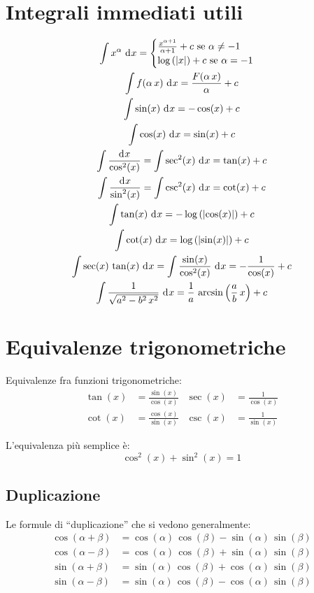 \section{Integrali immediati utili}

\begin{gather*}
\int x^{\alpha} \dx = 
\begin{cases}
\frac{x^{\alpha + 1}}{\alpha + 1} + c \text{ se } \alpha \neq -1 \\
\abslog{x} + c \text{ se } \alpha = -1
\end{cases} \\
\int f(\alpha \, x) \dx = \frac{F(\alpha \, x)}{\alpha} + c \\
\int \sin (x) \dx = - \cos (x) + c \\
\int \cos (x) \dx = \sin (x) + c \\
\int \frac{\diff x}{\cos^2 (x)} = \int \sec^2 (x) \dx = \tan (x) + c \\
\int \frac{\diff x}{\sin^2 (x)} = \int \csc^2 (x) \dx = \cot (x) + c \\
\int \tan (x) \dx = - \abslog{\cos (x)} + c \\
\int \cot (x) \dx = \abslog{\sin (x)} + c \\
\int \sec (x) \, \tan (x) \dx = \int \frac{\sin(x)}{\cos^2 (x)} \dx =
- \frac{1}{\cos(x)} + c \\
\int \frac{1}{\sqrt{a^2 - b^2 \, x^2}} \dx =
\frac{1}{a} \, \arcsin \left( \frac{a}{b} \, x \right) + c
\end{gather*}

\section{Equivalenze trigonometriche}

Equivalenze fra funzioni trigonometriche:
\begin{align*}
\tan (x) &= \frac{\sin(x)}{\cos(x)} & \sec (x) &= \frac{1}{\cos(x)}  \\
\cot (x) &= \frac{\cos(x)}{\sin(x)} & \csc (x) &= \frac{1}{\sin(x)}
\end{align*}

L'equivalenza pi\`u semplice \`e:
\[
\cos^2 (x) + \sin^2 (x) = 1
\]

\subsection{Duplicazione}

Le formule di ``duplicazione'' che si vedono generalmente:
\begin{align*}
\cos(\alpha + \beta) &= \cos(\alpha) \, \cos(\beta) - \sin(\alpha) \, \sin(\beta) \\
\cos(\alpha - \beta) &= \cos(\alpha) \, \cos(\beta) + \sin(\alpha) \, \sin(\beta) \\
\sin(\alpha + \beta) &= \sin(\alpha) \, \cos(\beta) + \cos(\alpha) \, \sin(\beta)\\
\sin(\alpha - \beta) &= \sin(\alpha) \, \cos(\beta) - \cos(\alpha) \, \sin(\beta)
\end{align*}

